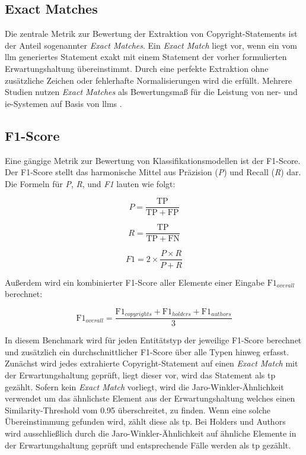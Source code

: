 \subsection{Exact Matches}
Die zentrale Metrik zur Bewertung der Extraktion von Copyright-Statements ist der Anteil sogenannter \textit{Exact Matches}.
Ein \textit{Exact Match} liegt vor, wenn ein vom \gls{llm} generiertes Statement exakt mit einem Statement der vorher formulierten Erwartungshaltung übereinstimmt.
Durch eine perfekte Extraktion ohne zusätzliche Zeichen oder fehlerhafte Normalisierungen wird die  erfüllt.
Mehrere Studien nutzen \textit{Exact Matches} als Bewertungsmaß für die Leistung von \gls{ner}- und \gls{ie}-Systemen auf Basis von \glspl{llm} \autocite{dunn_structured_2022}\autocite{hu_improving_2024}.

\subsection{F1-Score}
Eine gängige Metrik zur Bewertung von Klassifikationsmodellen ist der F1-Score\autocite{noauthor_f-score_2025}.
Der F1-Score stellt das harmonische Mittel aus Präzision (\textit{P}) und Recall (\textit{R}) dar.
Die Formeln für \textit{P}, \textit{R}, und \textit{F1} lauten wie folgt:

\[
 P = \frac{\mathrm{TP}}{\mathrm{TP} + \mathrm{FP}}
\]

\[
 R = \frac{\mathrm{TP}}{\mathrm{TP} + \mathrm{FN}}
\]

\[
 F1 = 2 \times \frac{P \times R}{P + R}
\]

Außerdem wird ein kombinierter F1-Score aller Elemente einer Eingabe $\mathrm{F1}_{overall}$ berechnet:

\[
 \mathrm{F1}_{overall} = \frac{\mathrm{F1}_{copyrights} + \mathrm{F1}_{holders} + \mathrm{F1}_{authors}}{3}
\]

In diesem Benchmark wird für jeden Entitätstyp der jeweilige F1-Score berechnet und zusätzlich ein durchschnittlicher F1-Score über alle Typen hinweg erfasst.
Zunächst wird jedes extrahierte Copyright-Statement auf einen \textit{Exact Match} mit der Erwartungshaltung geprüft, liegt dieser vor, wird das Statement als \gls{tp} gezählt.
Sofern kein \textit{Exact Match} vorliegt, wird die Jaro-Winkler-Ähnlichkeit\autocite{noauthor_jarowinkler_nodate} verwendet um das ähnlichste Element aus der Erwartungshaltung welches einen Similarity-Threshold vom \num{0,95} überschreitet, zu finden.
Wenn eine solche Übereinstimmung gefunden wird, zählt diese als \gls{tp}.
Bei Holders und Authors wird ausschließlich durch die Jaro-Winkler-Ähnlichkeit auf ähnliche Elemente in der Erwartungshaltung geprüft und entsprechende Fälle werden als \gls{tp} gezählt.

